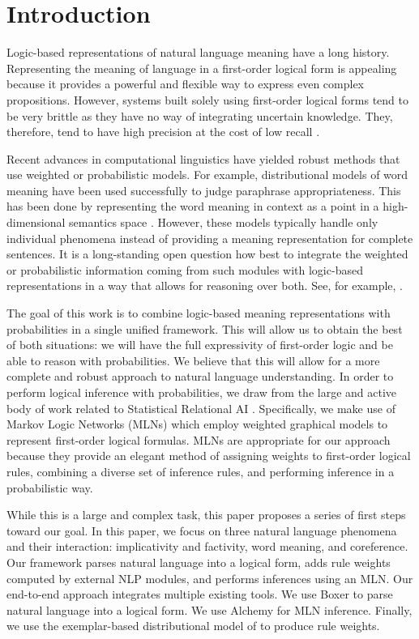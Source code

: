 \section{Introduction}

Logic-based representations of natural language meaning have a long history.  
Representing the meaning of language in a first-order
logical form is appealing because it provides a powerful and flexible way to
express even complex propositions. 
However, systems built solely using first-order logical forms tend to be very
brittle as they have no way of integrating uncertain knowledge. 
They, therefore, tend to have high precision at the cost of low
recall \citep{bos:emnlp2005}.

Recent advances in computational linguistics have yielded robust methods that
use weighted or probabilistic models.  For example, distributional models of
word meaning have been used successfully to judge paraphrase appropriateness.
This has been done by representing the word meaning in context as a point in a
high-dimensional semantics space
\citep{erk:emnlp08,ThaterFuerstenauPinkal:10,erk:acl2010}. However, these
models typically handle only individual phenomena instead of providing a meaning
representation for complete sentences. It is a long-standing open question how
best to integrate the weighted or probabilistic information coming from such
modules with logic-based representations in a way that allows for reasoning over
both.  See, for example, \citet{hobbs:alj93}.

The goal of this work is to combine logic-based meaning representations
with probabilities in a single unified framework.  This will allow us to obtain
the best of both situations: we will have the full expressivity of 
first-order logic and be able to reason with probabilities.  We believe that
this will allow for a more complete and robust approach to natural language
understanding. In order to perform logical inference with probabilities, we draw 
from the large and active body of work related to Statistical Relational AI
\citep{getoor:book2007}.  Specifically, we make use of Markov Logic Networks
(MLNs) \citep{richardson:mlj06} which employ weighted graphical models to
represent first-order logical formulas. MLNs are appropriate for our approach
because they provide an elegant method of assigning weights to first-order
logical rules, combining a diverse set of inference rules, and performing
inference in a probabilistic way. 

While this is a large and complex task, this paper proposes a series
of first steps toward our goal. 
In this paper, we focus on three natural language phenomena and their
interaction: implicativity and factivity, word meaning, and coreference.
Our framework parses natural language
into a logical form, adds rule weights computed by external NLP
modules, and performs inferences using an MLN. Our end-to-end approach
integrates multiple existing tools.
We use Boxer
\citep{bos:coling2004} to parse natural language into a logical form.
We use Alchemy \citep{kok:tr05} for MLN inference. Finally, we use the
exemplar-based distributional model of \citet{erk:acl2010} to produce
rule weights.
